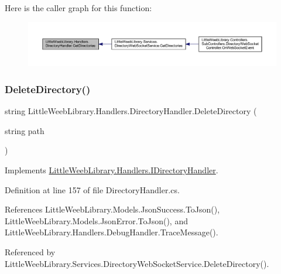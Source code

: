 Here is the caller graph for this function\+:\nopagebreak
\begin{figure}[H]
\begin{center}
\leavevmode
\includegraphics[width=350pt]{class_little_weeb_library_1_1_handlers_1_1_directory_handler_aa9d1414a83cadcf99da2cad30f39b2e3_icgraph}
\end{center}
\end{figure}
\mbox{\label{class_little_weeb_library_1_1_handlers_1_1_directory_handler_aeae514c438e071fe95c42ff74e0fef9d}} 
\subsubsection{\texorpdfstring{Delete\+Directory()}{DeleteDirectory()}}
{\footnotesize\ttfamily string Little\+Weeb\+Library.\+Handlers.\+Directory\+Handler.\+Delete\+Directory (\begin{DoxyParamCaption}\item[{string}]{path }\end{DoxyParamCaption})}



Implements \mbox{\hyperlink{interface_little_weeb_library_1_1_handlers_1_1_i_directory_handler_a7fcae4cc311e09d32b84327b74d80828}{Little\+Weeb\+Library.\+Handlers.\+I\+Directory\+Handler}}.



Definition at line 157 of file Directory\+Handler.\+cs.



References Little\+Weeb\+Library.\+Models.\+Json\+Success.\+To\+Json(), Little\+Weeb\+Library.\+Models.\+Json\+Error.\+To\+Json(), and Little\+Weeb\+Library.\+Handlers.\+Debug\+Handler.\+Trace\+Message().



Referenced by Little\+Weeb\+Library.\+Services.\+Directory\+Web\+Socket\+Service.\+Delete\+Directory().


